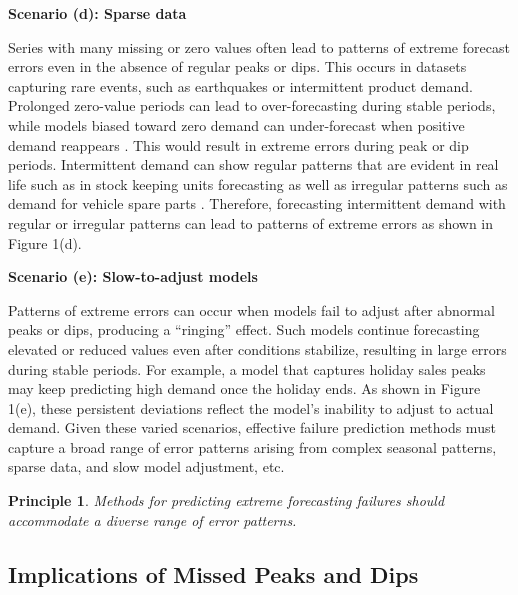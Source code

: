 \documentclass[ijds,sglanonrev]{informs4}
\newtheorem{principle}{Principle}
\newenvironment{scenario}[1]{%
  \par\vspace{1ex}\noindent\textbf{#1}\par\vspace{0.5ex}}{\par}
\begin{document}
\begin{scenario}{Scenario (d): Sparse data}

Series with many missing or zero values often lead to patterns of extreme forecast errors even in the absence of regular peaks or dips. This occurs in datasets capturing rare events, such as earthquakes or intermittent product demand. Prolonged zero-value periods can lead to over-forecasting during stable periods, while models biased toward zero demand can under-forecast when positive demand reappears \citep{wang2024b}. This would result in extreme errors during peak or dip periods. Intermittent demand can show regular patterns that are evident in real life such as in stock keeping units forecasting \citep{nikolopoulos2021, nikolopoulos2016} as well as irregular patterns \citep{kaya2020} such as demand for vehicle spare parts \citep{jiang2021}. Therefore, forecasting intermittent demand with regular or irregular patterns can lead to patterns of extreme errors as shown in Figure 1(d).
\end{scenario}

\begin{scenario}{Scenario (e): Slow-to-adjust models}

Patterns of extreme errors can occur when models fail to adjust after abnormal peaks or dips, producing a “ringing” effect. Such models continue forecasting elevated or reduced values even after conditions stabilize, resulting in large errors during stable periods. For example, a model that captures holiday sales peaks may keep predicting high demand once the holiday ends. As shown in Figure 1(e), these persistent deviations reflect the model’s inability to adjust to actual demand. Given these varied scenarios, effective failure prediction methods must capture a broad range of error patterns arising from complex seasonal patterns, sparse data, and slow model adjustment, etc.
\end{scenario}

\begin{principle}
\textit{Methods for predicting extreme forecasting failures should accommodate a diverse range of error patterns.}
\end{principle}


\subsection{Implications of Missed Peaks and Dips}
\end{document}
